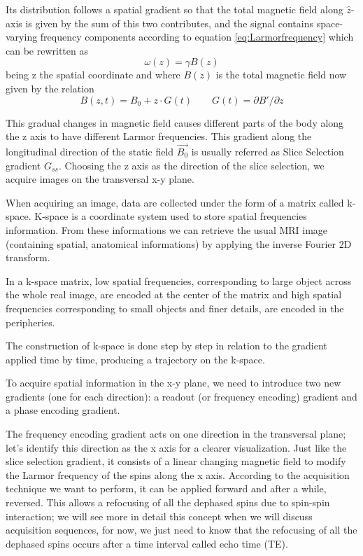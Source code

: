 \documentclass[11pt]{report}
\begin{document}
Its distribution follows a spatial gradient so that the total magnetic field along $\hat z$-axis is given by the sum of this two contributes, and the signal contains space-varying frequency components according to equation \textcolor{ForestGreen}{\ref{eq:Larmorfrequency}} which can be rewritten as
\begin{equation}
\omega(z) = \gamma B(z)
\end{equation}
being z the spatial coordinate and where $B(z)$ is the total magnetic field now given by the relation
\begin{equation}
B(z, t) = B_0 + z\cdot G(t) \qquad G(t) =\partial B'/\partial z
\end{equation}

This gradual changes in magnetic field causes different parts of the body along the z axis to have different Larmor frequencies.
This gradient along the longitudinal direction of the static field $\vec{B_0}$ is usually referred as Slice Selection gradient $G_{ss}$.
Choosing the z axis as the direction of the slice selection, we acquire images on the transversal x-y plane.


When acquiring an image, data are collected under the form of a matrix called k-space.
K-space is a coordinate system used to store spatial frequencies information. From these informations we can retrieve the usual MRI image (containing spatial, anatomical informations) by applying the inverse Fourier 2D transform.

In a k-space matrix, low spatial frequencies, corresponding to large object across the whole real image, are encoded at the center of the matrix and high spatial frequencies corresponding to small objects and finer details, are encoded in the peripheries.

The construction of k-space is done step by step in relation to the gradient applied time by time, producing a trajectory on the k-space.

To acquire spatial information in the x-y plane, we need to introduce two new gradients (one for each direction): a readout (or frequency encoding) gradient and a phase encoding gradient.

The frequency encoding gradient acts on one direction in the transversal plane; let's identify this direction as the x axis for a clearer visualization.
Just like the slice selection gradient, it consists of a linear changing magnetic field to modify the Larmor frequency of the spins along the x axis. According to the acquisition technique we want to perform, it can be applied forward and after a while, reversed. This allows a refocusing of all the dephased spins due to spin-spin interaction; we will see more in detail this concept when we will discuss acquisition sequences, for now, we just need to know that the refocusing of all the dephased spins occurs after a time interval called echo time (TE).
\end{document}
